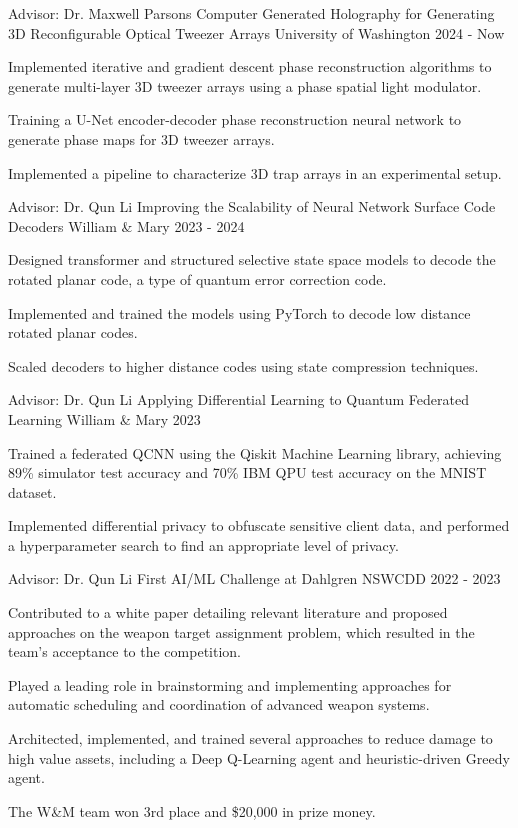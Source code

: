 
\begin{cventries}
\cventry
{Advisor: Dr. Maxwell Parsons}
{Computer Generated Holography for Generating 3D Reconfigurable Optical Tweezer Arrays}
{University of Washington}
{2024 - Now}
{{\begin{cvitems}
\item Implemented iterative and gradient descent phase reconstruction algorithms to generate multi-layer 3D tweezer arrays using a phase spatial light modulator.
\item Training a U-Net encoder-decoder phase reconstruction neural network to generate phase maps for 3D tweezer arrays.
\item Implemented a pipeline to characterize 3D trap arrays in an experimental setup.
\end{cvitems}
}}

\cventry
{Advisor: Dr. Qun Li}
{Improving the Scalability of Neural Network Surface Code Decoders}
{William \& Mary}
{2023 - 2024}
{{\begin{cvitems}
\item Designed transformer and structured selective state space models to decode the rotated planar code, a type of quantum error correction code.
\item Implemented and trained the models using PyTorch to decode low distance rotated planar codes.
\item Scaled decoders to higher distance codes using state compression techniques.
\end{cvitems}
}}

\cventry
{Advisor: Dr. Qun Li}
{Applying Differential Learning to Quantum Federated Learning}
{William \& Mary}
{2023}
{{\begin{cvitems}
\item Trained a federated QCNN using the Qiskit Machine Learning library, achieving 89\% simulator test accuracy and 70\% IBM QPU test accuracy on the MNIST dataset.
\item Implemented differential privacy to obfuscate sensitive client data, and performed a hyperparameter search to find an appropriate level of privacy. 
\end{cvitems}
}}

\cventry
{Advisor: Dr. Qun Li}
{First AI/ML Challenge at Dahlgren}
{NSWCDD}
{2022 - 2023}
{{\begin{cvitems}
\item Contributed to a white paper detailing relevant literature and proposed approaches on the weapon target assignment problem, which resulted in the team's acceptance to the competition.
\item Played a leading role in brainstorming and implementing approaches for automatic scheduling and coordination of advanced weapon systems.
\item Architected, implemented, and trained several approaches to reduce damage to high value assets, including a Deep Q-Learning agent and heuristic-driven Greedy agent.
\item The W\&M team won 3rd place and \$20,000 in prize money. 
\end{cvitems}
}}


\end{cventries}
